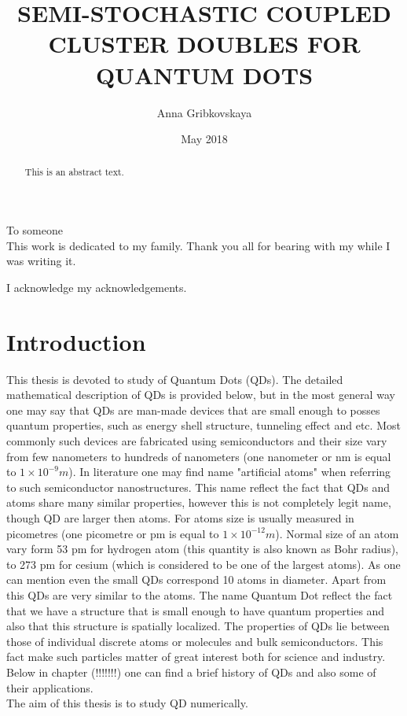 \documentclass[twoside,english]{uiofysmaster}
\author{Anna Gribkovskaya}
\title{\uppercase{Semi-stochastic Coupled Cluster Doubles for Quantum Dots}}
\date{May 2018}
\theoremstyle{definition}
\begin{document}
\begin{titlepage}
\maketitle
\end{titlepage}
\begin{abstract}
	This is an abstract text.
\end{abstract}

\begin{dedication}
	To someone
	\\\vspace{12pt}
	This work is dedicated to my family. Thank you all for bearing with my while I was writing it.
\end{dedication}
\begin{acknowledgements}
	I acknowledge my acknowledgements.
\end{acknowledgements}
\tableofcontents

\chapter*{Introduction}
This thesis is devoted to study of Quantum Dots (QDs). The detailed mathematical description of QDs is provided below, but in the most general way one may say that QDs are man-made devices that are small enough to posses quantum properties, such as energy shell structure, tunneling effect and etc. Most commonly such devices are fabricated using semiconductors and their size vary from few nanometers to hundreds of nanometers (one nanometer or nm is equal to $1\times 10^{-9} m$). In literature one may find name "artificial atoms" when referring to such  semiconductor nanostructures. This name reflect the fact that QDs and atoms share many similar properties, however this is not completely legit name, though QD are larger then atoms. For atoms size is usually measured in picometres  (one picometre or pm is equal to $1\times 10^{-12} m$).  Normal size of an atom vary form 53 pm for hydrogen atom (this quantity is also known as Bohr radius), to  273 pm for cesium (which is considered to be one of the largest atoms). As one can mention even the small QDs correspond 10 atoms in diameter. Apart from this QDs are very similar to the atoms. The name Quantum Dot reflect the fact that we have a structure that is small enough to have quantum properties and also that this structure is spatially localized. The properties of QDs lie between those of individual discrete atoms or molecules and bulk semiconductors. This fact make such particles matter of great interest both for science and industry. Below in chapter (!!!!!!!) one can find a brief history of QDs and also  some of their applications.  \\
The aim of this thesis is to study QD numerically. 
\end{document}
